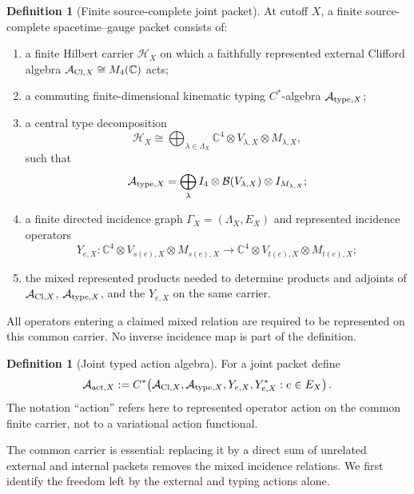 \documentclass[11pt]{article}
\numberwithin{equation}{section}
\theoremstyle{definition}
\newtheorem{definition}[theorem]{Definition}
\theoremstyle{remark}
\newcommand{\C}{\mathbb C}
\newcommand{\A}{\mathcal A}
\newcommand{\Hh}{\mathcal H}
\begin{document}
\begin{definition}[Finite source-complete joint packet]
\label{def:joint-packet}
At cutoff $X$, a finite source-complete spacetime--gauge packet consists of:
\begin{enumerate}[label=\textup{(J\arabic*)},leftmargin=3em]
\item a finite Hilbert carrier $\Hh_X$ on which a faithfully represented
      external Clifford algebra
      $\A_{{\rm Cl},X}\cong M_4(\C)$ acts;
\item a commuting finite-dimensional kinematic typing $C^*$-algebra
      $\A_{{\rm type},X}$;
\item a central type decomposition
      \[
      \Hh_X
      \cong
      \bigoplus_{\lambda\in\Lambda_X}
      \C^4\otimes V_{\lambda,X}\otimes M_{\lambda,X},
      \]
      such that
      \[
      \A_{{\rm type},X}
      =
      \bigoplus_{\lambda}
      I_4\otimes\mathcal B(V_{\lambda,X})\otimes I_{M_{\lambda,X}};
      \]
\item a finite directed incidence graph
      $\Gamma_X=(\Lambda_X,E_X)$ and represented incidence operators
      \[
      Y_{e,X}:
      \C^4\otimes V_{s(e),X}\otimes M_{s(e),X}
      \longrightarrow
      \C^4\otimes V_{t(e),X}\otimes M_{t(e),X};
      \]
\item the mixed represented products needed to determine products and adjoints
      of $\A_{{\rm Cl},X}$, $\A_{{\rm type},X}$, and the $Y_{e,X}$ on the same
      carrier.
\end{enumerate}
All operators entering a claimed mixed relation are required to be represented
on this common carrier.  No inverse incidence map is part of the definition.
\end{definition}

\begin{definition}[Joint typed action algebra]
\label{def:action-algebra}
For a joint packet define
\begin{equation}
\A_{{\rm act},X}
:=
C^*\!\left(
\A_{{\rm Cl},X},
\A_{{\rm type},X},
Y_{e,X},Y_{e,X}^*:e\in E_X
\right).
\label{eq:joint-action-algebra}
\end{equation}
The notation ``action'' refers here to represented operator action on the
common finite carrier, not to a variational action functional.
\end{definition}

The common carrier is essential: replacing it by a direct sum of unrelated
external and internal packets removes the mixed incidence relations.  We first
identify the freedom left by the external and typing actions alone.
\end{document}
